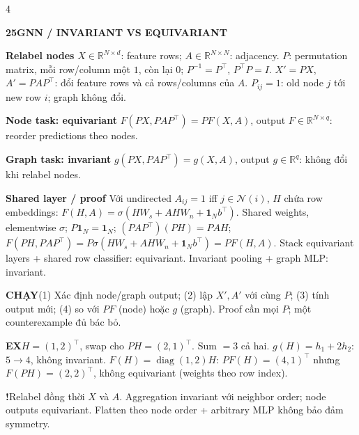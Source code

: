 \documentclass[a4paper]{article}
\newcommand{\topic}[2]{\par\addvspace{.8pt}%
  \begingroup\setlength{\fboxsep}{0.5pt}%
  \noindent\colorbox{structure}{\parbox{\dimexpr\linewidth-2\fboxsep\relax}{%
    \color{white}\fontsize{6.5}{7.1}\selectfont\bfseries #1\enspace #2}}%
  \endgroup\par\nobreak\vspace{.3pt}\nobreak}
\newcommand{\run}[1]{\key{CHẠY}#1}
\newcommand{\key}[1]{\par\textcolor{structure}{\textbf{#1}}\enspace}
\newcommand{\note}[4]{\par\begingroup\setlength{\fboxsep}{0.15pt}%
  \noindent\colorbox{#1}{\parbox{\dimexpr\linewidth-2\fboxsep\relax}{%
    \RaggedRight\textcolor{#2}{\textbf{#3}}\enspace #4}}%
  \endgroup\par}
\newcommand{\trap}[1]{\note{warningbg}{warning}{!}{#1}}
\newcommand{\ex}[1]{\note{examplebg}{example}{EX}{#1}}
\newcommand{\R}{\mathbb{R}}
\newcommand{\ind}{\mathbf1}
\newcommand{\diag}{\operatorname{diag}}
\begin{document}
\begin{multicols*}{4}
\topic{25}{GNN / INVARIANT VS EQUIVARIANT}
\key{Relabel nodes}
$X\in\R^{N\times d}$: feature rows; $A\in\R^{N\times N}$: adjacency. $P$: permutation matrix, mỗi row/column một $1$, còn lại $0$; $P^{-1}=P^\top$, $P^\top P=I$.
$X'=PX$, $A'=PAP^\top$: đổi feature rows và cả rows/columns của $A$. $P_{ij}=1$: old node $j$ tới new row $i$; graph không đổi.
\key{Node task: equivariant}
$F(PX,PAP^\top)=PF(X,A)$, output $F\in\R^{N\times q}$: reorder predictions theo nodes.
\key{Graph task: invariant}
$g(PX,PAP^\top)=g(X,A)$, output $g\in\R^q$: không đổi khi relabel nodes.
\key{Shared layer / proof}
Với undirected $A_{ij}=1$ iff $j\in\mathcal N(i)$, $H$ chứa row embeddings:
$F(H,A)=\sigma(HW_s+AHW_n+\ind_Nb^\top)$.
Shared weights, elementwise $\sigma$; $P\ind_N=\ind_N$;
$(PAP^\top)(PH)=PAH$;
$F(PH,PAP^\top)=P\sigma(HW_s+AHW_n+\ind_Nb^\top)=PF(H,A)$.
Stack equivariant layers + shared row classifier: equivariant. Invariant pooling + graph MLP: invariant.
\run{(1) Xác định node/graph output; (2) lập $X',A'$ với cùng $P$; (3) tính output mới; (4) so với $PF$ (node) hoặc $g$ (graph). Proof cần mọi $P$; một counterexample đủ bác bỏ.}
\ex{$H=(1,2)^\top$, swap cho $PH=(2,1)^\top$. Sum $=3$ cả hai. $g(H)=h_1+2h_2$: $5\to4$, không invariant. $F(H)=\diag(1,2)H$: $PF(H)=(4,1)^\top$ nhưng $F(PH)=(2,2)^\top$, không equivariant (weights theo row index).}
\trap{Relabel đồng thời $X$ và $A$. Aggregation invariant với neighbor order; node outputs equivariant. Flatten theo node order + arbitrary MLP không bảo đảm symmetry.}


\end{multicols*}
\end{document}
